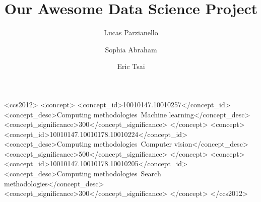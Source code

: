 \title[Data Science Project]{Our Awesome Data Science Project}


\author{Lucas Parzianello}

\author{Sophia Abraham}

\author{Eric Tsai}

\renewcommand{\shortauthors}{Parzianello, Abraham, and Tsai.}

\begin{abstract}
  \lipsum[9]
\end{abstract}

\begin{CCSXML}
<ccs2012>
<concept>
<concept_id>10010147.10010257</concept_id>
<concept_desc>Computing methodologies~Machine learning</concept_desc>
<concept_significance>300</concept_significance>
</concept>
<concept>
<concept_id>10010147.10010178.10010224</concept_id>
<concept_desc>Computing methodologies~Computer vision</concept_desc>
<concept_significance>500</concept_significance>
</concept>
<concept>
<concept_id>10010147.10010178.10010205</concept_id>
<concept_desc>Computing methodologies~Search methodologies</concept_desc>
<concept_significance>300</concept_significance>
</concept>
</ccs2012>
\end{CCSXML}

